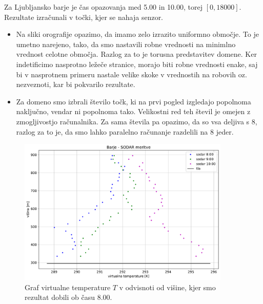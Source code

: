 \documentclass[mat2, tisk]{fmfdelo}
\begin{document}
Za Ljubljansko barje je čas opazovanja med 5.00 in 10.00, torej $[0, 18000]$.
Rezultate izračunali v točki, kjer se nahaja senzor. 
\begin{opomba}
\hfill
\begin{itemize}
  \item Na sliki orografije opazimo, da imamo zelo izrazito uniformno območje. 
  To je umetno narejeno, tako, da smo nastavili robne vrednosti na minimlno vrednost celotne 
  območja. Razlog za to je torusna predstavitev domene. Ker indetificimo nasprotno 
  ležeče stranice, morajo biti robne vrednosti enake, saj bi v nasprotnem primeru
  nastale velike skoke v vrednostih na robovih oz. nezveznoti, kar bi pokvarilo rezultate.
\item Za domeno smo izbrali število točk, ki na prvi pogled izgledajo popolnoma naključno, 
vendar ni popolnoma tako. Velikostni red teh števil je omejen z zmogljivostjo računalnika.
Za sama števila pa opazimo, da so vsa deljiva s 8, razlog za to je, da smo lahko 
paralelno računanje razdelili na 8 jeder.
\end{itemize}
\end{opomba}
\begin{figure}[h!]
  \centering
  \includegraphics[width=0.9\textwidth]{rezultati/barje_sodar_tv_345.pdf}
  \caption{Graf virtualne temperature $T$ v odvisnoti od višine, kjer smo 
  rezultat dobili ob času 8.00.}
  \label{fig:barje_T3}
\end{figure}
\end{document}
